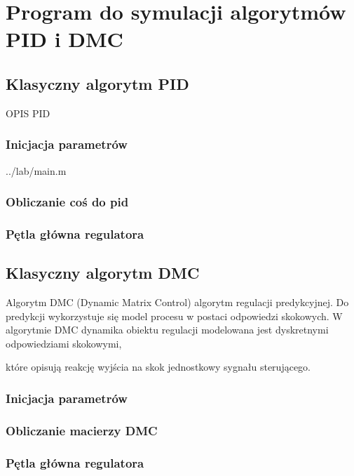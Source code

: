 \section{Program do symulacji algorytmów PID i DMC}
\label{projekt:zad3}

\subsection{Klasyczny algorytm PID}
\label{projekt:zad3:PID:program}

OPIS PID


\subsubsection{Inicjacja parametrów}


    {../lab/main.m}
\newpage

\subsubsection{Obliczanie coś do pid}
%
\newpage


\subsubsection{Pętla główna regulatora}
%

\newpage

\subsection{Klasyczny algorytm DMC}
\label{projekt:zad3:DMC:program}

Algorytm DMC (Dynamic Matrix Control) algorytm regulacji predykcyjnej. 
Do predykcji wykorzystuje się model procesu w postaci odpowiedzi skokowych. 
W algorytmie DMC dynamika obiektu regulacji modelowana jest dyskretnymi odpowiedziami skokowymi, 

które opisują reakcję wyjścia na skok jednostkowy sygnału sterującego.

\subsubsection{Inicjacja parametrów}
%
\newpage

\subsubsection{Obliczanie macierzy DMC}
%
\newpage


\subsubsection{Pętla główna regulatora}
%
\newpage
